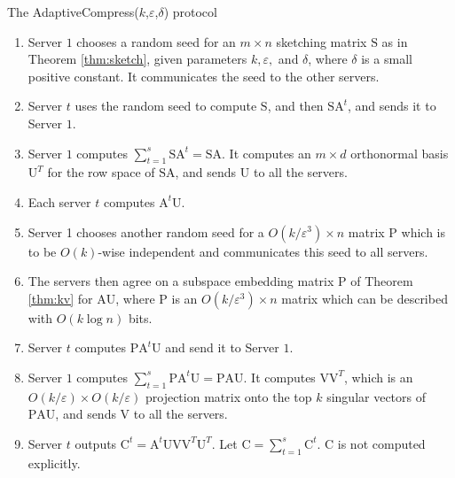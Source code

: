 \documentclass[11pt]{article}
\newcommand{\mat}[1]{{\ensuremath{\bm{\mathrm{#1}}}}}
\def\matA{\mat{A}}
\def\matC{\mat{C}}
\def\matP{\mat{P}}
\def\matS{\mat{S}}
\def\matU{\mat{U}}
\def\matV{\mat{V}}
\newcommand{\eps}{\varepsilon}
\begin{document}
\begin{algorithm}[p]
\caption{The {\sf AdaptiveCompress}($k$,$\eps$,$\delta$) protocol}
\begin{enumerate}
\item Server $1$ chooses a random seed for an $m \times n$ sketching matrix $\matS$ 
as in Theorem \ref{thm:sketch},
given parameters $k, \eps,$ and $\delta$, where $\delta$ is a small positive constant.
It communicates the seed to the other servers.
\item Server $t$ uses the random seed to compute $\matS$, and then $\matS \matA^t$, 
and sends it to Server $1$.
\item Server $1$ computes $\sum_{t=1}^s \matS \matA^t = \matS \matA$. It computes an $m \times d$
orthonormal basis $\matU^T$ for the row space of $\matS \matA$, and sends $\matU$ to all the servers.
\item Each server $t$ computes $\matA^t \matU$. 
\item Server 1 chooses another random seed for a $O(k/\varepsilon^3)\times n$ matrix $\matP$ 
which is to be $O(k)$-wise independent and communicates this seed to all servers.
\item The servers then agree on a subspace embedding matrix $\matP$ of Theorem \ref{thm:kv} 
for $\matA \matU$, 
where $\matP$ is an $O(k/\eps^3) \times n$ matrix which can be described with $O(k \log n)$ bits.
\item Server $t$ computes $\matP \matA^t \matU$ and send it to Server $1$.
\item Server $1$ computes $\sum_{t=1}^s \matP \matA^t \matU = \matP \matA \matU$. 
It computes $\matV \matV^T$, which is an $O(k/\eps) \times O(k/\eps)$ projection 
matrix onto the top $k$ singular vectors of $\matP \matA \matU$, and sends $\matV$ to all the servers.
\item Server $t$ outputs $\matC^t = \matA^t \matU \matV \matV^T \matU^T$. 
Let $\matC=\sum_{t=1}^s \matC^t$. $\matC$ is not computed explicitly.
\end{enumerate}
\end{algorithm}
\end{document}
